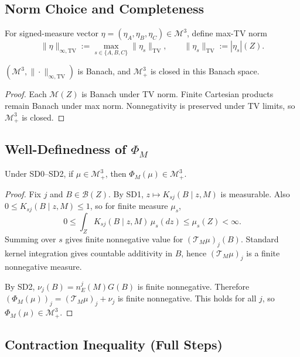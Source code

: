 \subsection{Norm Choice and Completeness}

For signed-measure vector $\eta=(\eta_A,\eta_B,\eta_C)\in\mathcal M^3$, define max-TV norm
\begin{equation}
\|\eta\|_{\infty,\mathrm{TV}}:=\max_{s\in\{A,B,C\}}\|\eta_s\|_{\mathrm{TV}},
\qquad
\|\eta_s\|_{\mathrm{TV}}:=|\eta_s|(Z).
\label{eq:p7_norm}
\end{equation}

\begin{lemma}[Completeness]
$(\mathcal M^3,\|\cdot\|_{\infty,\mathrm{TV}})$ is Banach, and $\mathcal M_+^3$ is closed in this Banach space.
\end{lemma}

\begin{proof}
Each $\mathcal M(Z)$ is Banach under TV norm. Finite Cartesian products remain Banach under max norm. Nonnegativity is preserved under TV limits, so $\mathcal M_+^3$ is closed.
\end{proof}

\subsection{Well-Definedness of $\Phi_M$}

\begin{lemma}
Under SD0--SD2, if $\mu\in\mathcal M_+^3$, then $\Phi_M(\mu)\in\mathcal M_+^3$.
\end{lemma}

\begin{proof}
Fix $j$ and $B\in\mathcal B(Z)$. By SD1, $z\mapsto K_{sj}(B\mid z,M)$ is measurable. Also $0\le K_{sj}(B\mid z,M)\le1$, so for finite measure $\mu_s$,
\[
0\le\int_Z K_{sj}(B\mid z,M)\,\mu_s(dz)\le\mu_s(Z)<\infty.
\]
Summing over $s$ gives finite nonnegative value for $(\mathcal T_M\mu)_j(B)$. Standard kernel integration gives countable additivity in $B$, hence $(\mathcal T_M\mu)_j$ is a finite nonnegative measure.

By SD2, $\nu_j(B)=n_E^j(M)G(B)$ is finite nonnegative. Therefore $(\Phi_M(\mu))_j=(\mathcal T_M\mu)_j+\nu_j$ is finite nonnegative. This holds for all $j$, so $\Phi_M(\mu)\in\mathcal M_+^3$.
\end{proof}

\subsection{Contraction Inequality (Full Steps)}

